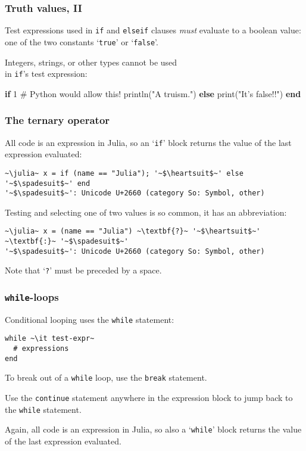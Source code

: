 \documentclass[english,serif,mathserif,xcolor=pdftex,dvipsnames,table]{beamer}
\begin{document}
\begin{frame}[fragile]
  \frametitle{Truth values, II}
  \small

  Test expressions used in \texttt{if} and \texttt{elseif} clauses
  \emph{must} evaluate to a boolean value: one of the two constants
  `\texttt{true}' or `\texttt{false}'.

  \+ Integers, strings, or other types cannot be used \\ in \texttt{if}'s
  test expression:
\begin{semiverbatim}
\julia \textbf{if} 1  # Python would allow this!
    println("A truism.")
  \textbf{else}
    print("It's false!!")
  \textbf{end}
\end{semiverbatim}
\end{frame}


\begin{frame}[fragile]
  \frametitle{The ternary operator}
  All code is an expression in Julia, so an `\texttt{if}' block
  returns the value of the last expression evaluated:
\begin{lstlisting}
~\julia~ x = if (name == "Julia"); '~$\heartsuit$~' else '~$\spadesuit$~' end
'~$\spadesuit$~': Unicode U+2660 (category So: Symbol, other)
\end{lstlisting}

  \+ Testing and selecting one of two values is so common, it has an
  abbreviation:
\begin{lstlisting}
~\julia~ x = (name == "Julia") ~\textbf{?}~ '~$\heartsuit$~' ~\textbf{:}~ '~$\spadesuit$~'
'~$\spadesuit$~': Unicode U+2660 (category So: Symbol, other)
\end{lstlisting}
  Note that `\texttt{?}' must be preceded by a space.
\end{frame}


\begin{frame}[fragile]
  \frametitle{\texttt{while}-loops}
  Conditional looping uses the \texttt{while} statement:
\begin{lstlisting}
while ~\it test-expr~
  # expressions
end
\end{lstlisting}

  \+
  To break out of a \texttt{while} loop, use the \texttt{break}
  statement.

  \+
  Use the \texttt{continue} statement anywhere in the expression
  block to jump back to the \texttt{while} statement.

  \+ Again, all code is an expression in Julia, so also a
  `\texttt{while}' block returns the value of the last expression
  evaluated.
\end{frame}
\end{document}
